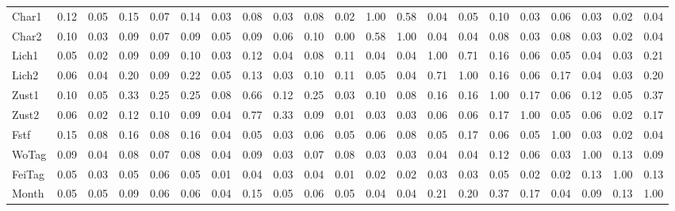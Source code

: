\begin{tabular}{lrrrrrrrrrrrrrrrrrrrr}
Char1   &     0.12 & 0.05 & 0.15 &   0.07 &   0.14 &   0.03 &   0.08 &   0.03 &   0.08 &   0.02 &   1.00 &   0.58 &   0.04 &   0.05 &   0.10 &   0.03 &  0.06 &   0.03 &    0.02 &   0.04 \\
Char2   &     0.10 & 0.03 & 0.09 &   0.07 &   0.09 &   0.05 &   0.09 &   0.06 &   0.10 &   0.00 &   0.58 &   1.00 &   0.04 &   0.04 &   0.08 &   0.03 &  0.08 &   0.03 &    0.02 &   0.04 \\
Lich1   &     0.05 & 0.02 & 0.09 &   0.09 &   0.10 &   0.03 &   0.12 &   0.04 &   0.08 &   0.11 &   0.04 &   0.04 &   1.00 &   0.71 &   0.16 &   0.06 &  0.05 &   0.04 &    0.03 &   0.21 \\
Lich2   &     0.06 & 0.04 & 0.20 &   0.09 &   0.22 &   0.05 &   0.13 &   0.03 &   0.10 &   0.11 &   0.05 &   0.04 &   0.71 &   1.00 &   0.16 &   0.06 &  0.17 &   0.04 &    0.03 &   0.20 \\
Zust1   &     0.10 & 0.05 & 0.33 &   0.25 &   0.25 &   0.08 &   0.66 &   0.12 &   0.25 &   0.03 &   0.10 &   0.08 &   0.16 &   0.16 &   1.00 &   0.17 &  0.06 &   0.12 &    0.05 &   0.37 \\
Zust2   &     0.06 & 0.02 & 0.12 &   0.10 &   0.09 &   0.04 &   0.77 &   0.33 &   0.09 &   0.01 &   0.03 &   0.03 &   0.06 &   0.06 &   0.17 &   1.00 &  0.05 &   0.06 &    0.02 &   0.17 \\
Fstf    &     0.15 & 0.08 & 0.16 &   0.08 &   0.16 &   0.04 &   0.05 &   0.03 &   0.06 &   0.05 &   0.06 &   0.08 &   0.05 &   0.17 &   0.06 &   0.05 &  1.00 &   0.03 &    0.02 &   0.04 \\
WoTag   &     0.09 & 0.04 & 0.08 &   0.07 &   0.08 &   0.04 &   0.09 &   0.03 &   0.07 &   0.08 &   0.03 &   0.03 &   0.04 &   0.04 &   0.12 &   0.06 &  0.03 &   1.00 &    0.13 &   0.09 \\
FeiTag  &     0.05 & 0.03 & 0.05 &   0.06 &   0.05 &   0.01 &   0.04 &   0.03 &   0.04 &   0.01 &   0.02 &   0.02 &   0.03 &   0.03 &   0.05 &   0.02 &  0.02 &   0.13 &    1.00 &   0.13 \\
Month   &     0.05 & 0.05 & 0.09 &   0.06 &   0.06 &   0.04 &   0.15 &   0.05 &   0.06 &   0.05 &   0.04 &   0.04 &   0.21 &   0.20 &   0.37 &   0.17 &  0.04 &   0.09 &    0.13 &   1.00 \\
\bottomrule
\end{tabular}
